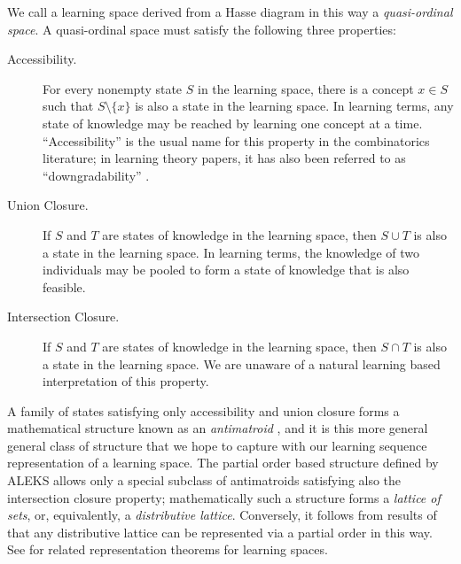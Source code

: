 \documentclass[11pt]{llncs}
\begin{document}
{We call a learning space derived from a Hasse diagram in this way a \emph{quasi-ordinal space}. A quasi-ordinal space must satisfy the following three properties:

\begin{description}
\item[Accessibility.]
For every nonempty state $S$ in the learning space, there is a concept $x\in S$ such that $S\setminus\{x\}$ is also a state in the learning space. In learning terms, any state of knowledge may be reached by learning one concept at a time. ``Accessibility'' is the usual name for this property in the combinatorics literature;
in learning theory papers, it has also been referred to as ``downgradability'' \citep{doble01a}.

\item[Union Closure.]
If $S$ and $T$ are states of knowledge in the learning space, then $S\cup T$ is also a state in the learning space. In learning terms, the knowledge of two individuals may be pooled to form a state of knowledge that is also feasible.

\item[Intersection Closure.]
If $S$ and $T$ are states of knowledge in the learning space, then $S\cap T$ is also a state in the learning space. We are unaware of a natural learning based interpretation of this property.
\end{description}

A family of states satisfying only accessibility and union closure forms a mathematical structure known as an \emph{antimatroid} \citep{KorLovSch-91}, and it is this more general general class of structure that we hope to capture with our learning sequence representation of a learning space. The partial order based structure defined by ALEKS allows only a special subclass of antimatroids satisfying also the intersection closure property; mathematically such a structure forms a \emph{lattice of sets}, or, equivalently, a \emph{distributive lattice}.
Conversely, it follows from results of \citet{birkh37} that any distributive lattice can be represented via a partial order in this way. See \citet{doign99} for related representation theorems for learning spaces.

}
\end{document}
